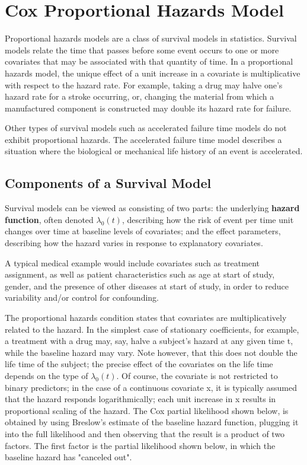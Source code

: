 \section{Cox Proportional Hazards Model}
Proportional hazards models are a class of survival models in statistics. Survival models relate the time that passes before some event occurs to one or more covariates that may be associated with that quantity of time. In a proportional hazards model, the unique effect of a unit increase in a covariate is multiplicative with respect to the hazard rate. For example, taking a drug may halve one's hazard rate for a stroke occurring, or, changing the material from which a manufactured component is constructed may double its hazard rate for failure. 
\newline

Other types of survival models such as accelerated failure time models do not exhibit proportional hazards. The accelerated failure time model describes a situation where the biological or mechanical life history of an event is accelerated.

\subsection{Components of a Survival Model}
Survival models can be viewed as consisting of two parts: the underlying \textbf{hazard function}, often denoted $\lambda_0(t)$, describing how the risk of event per time unit changes over time at baseline levels of covariates; and the effect parameters, describing how the hazard varies in response to explanatory covariates.
 
A typical medical example would include covariates such as treatment assignment, as well as patient characteristics such as age at start of study, gender, and the presence of other diseases at start of study, in order to reduce variability and/or control for confounding.
\newline

The proportional hazards condition states that covariates are multiplicatively related to the hazard. In the simplest case of stationary coefficients, for example, a treatment with a drug may, say, halve a subject's hazard at any given time t, while the baseline hazard may vary. Note however, that this does not double the life time of the subject; the precise effect of the covariates on the life time depends on the type of $\lambda_0(t)$. Of course, the covariate is not restricted to binary predictors; in the case of a continuous covariate x, it is typically assumed that the hazard responds logarithmically; each unit increase in x results in proportional scaling of the hazard. The Cox partial likelihood shown below, is obtained by using Breslow's estimate of the baseline hazard function, plugging it into the full likelihood and then observing that the result is a product of two factors. The first factor is the partial likelihood shown below, in which the baseline hazard has "canceled out". 

